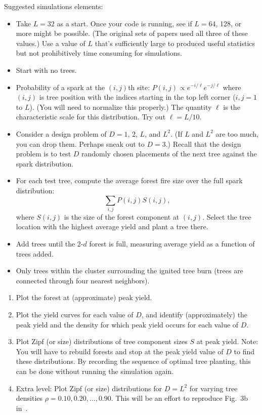 \begin{enumerate}
  Suggested simulations elements:
  \begin{itemize}
  \item 
    Take $L=32$ as a start.  Once your code is running, see if $L=64$, 128, or more might
    be possible.
    (The original sets of papers used all three of these values.)
    Use a value of $L$ that's sufficiently large to produced useful
    statistics but not prohibitively time consuming for simulations.
  \item 
    Start with no trees.
  \item 
    Probability of a spark at the $(i,j)$th site:
    $
    P(i,j) \propto e^{-i/\ell} e^{-j/\ell}
    $
    where $(i,j)$ is tree position with the indices
    starting in the top left corner ($i,j=1$ to $L$).
    (You will need to normalize this properly.)
    The quantity $\ell$ is the characteristic
    scale for this distribution.
    Try out $\ell = L/10$.
  \item 
    Consider a design problem of $D=1$, $2$, $L$, and $L^{2}$.
    (If $L$ and $L^{2}$ are too much, you can drop them.
    Perhaps sneak out to $D=3$.)
    Recall that the design problem is to test $D$ randomly
    chosen placements of the next tree against the
    spark distribution.
  \item 
    For each test tree, 
    compute the average forest fire size over the full spark
    distribution: 
    $$
    \sum_{i,j} P(i,j) S(i,j),
    $$
    where $S(i,j)$ is the size of the forest component
    at $(i,j)$.
    Select the tree location with the highest average yield and plant a tree there.
  \item 
    Add trees until the 2-$d$ forest is full, measuring average yield as a function of trees added.
  \item 
    Only trees within the cluster surrounding the ignited tree burn
    (trees are connected through four nearest neighbors).
  \end{itemize}

  \begin{enumerate}
  \item 
    Plot the forest at (approximate) peak yield.
  \item 
    Plot the yield curves for each value of $D$,
    and identify (approximately) the peak yield and the density
    for which peak yield occurs for each value of $D$.
  \item 
    Plot Zipf (or size) distributions of tree component sizes $S$
    at peak yield.
    Note: You will have to rebuild forests
    and stop at the peak yield value of $D$ to
    find these distributions.
    By recording the sequence of optimal tree planting,
    this can be done without running the simulation again.
  \item
    Extra level: Plot Zipf (or size) distributions for $D=L^2$ for
    varying tree densities $\rho=0.10, 0.20, \ldots, 0.90$.
    This will be an effort to reproduce
    Fig.~3b in~\cite{carlson2000a}.
  \end{enumerate}


\end{enumerate}
